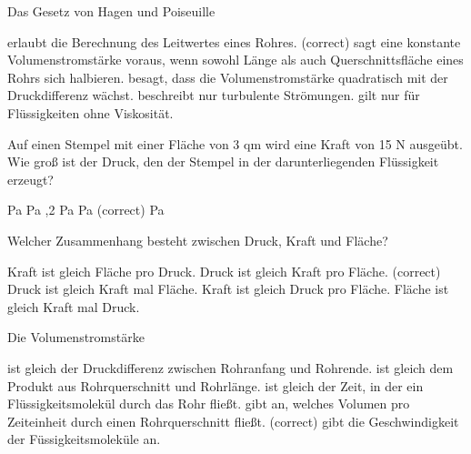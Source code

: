 \documentclass[11pt]{exam}
\begin{document}
\setlength{\voffset}{-0.5in}
\setlength{\headsep}{5pt}

\hspace{2mm}
 \hspace{5mm}
\vspace{4mm}

\begin{questions}

\question Das Gesetz von Hagen und Poiseuille

\begin{choices}
	\choice erlaubt die Berechnung des Leitwertes eines Rohres. (correct)
	\choice sagt eine konstante Volumenstromstärke voraus, wenn sowohl Länge als auch Querschnittsfläche eines Rohrs sich halbieren.
	\choice besagt, dass die Volumenstromstärke quadratisch mit der Druckdifferenz wächst.
	\choice beschreibt nur turbulente Strömungen.
	\choice gilt nur für Flüssigkeiten ohne Viskosität.
\end{choices}

\vspace{3mm}\question Auf einen Stempel mit einer Fläche von 3 qm wird eine Kraft von 15 N ausgeübt. Wie groß ist der Druck, den der Stempel in der darunterliegenden Flüssigkeit erzeugt?

\begin{choices}
	 Pa
	 Pa
	,2 Pa
	 Pa (correct)
	 Pa
\end{choices}

\vspace{3mm}\question Welcher Zusammenhang besteht zwischen Druck, Kraft und Fläche?

\begin{choices}
	\choice Kraft ist gleich Fläche pro Druck.
	\choice Druck ist gleich Kraft pro Fläche. (correct)
	\choice Druck ist gleich Kraft mal Fläche.
	\choice Kraft ist gleich Druck pro Fläche.
	\choice Fläche ist gleich Kraft mal Druck.
\end{choices}

\vspace{3mm}\question Die Volumenstromstärke

\begin{choices}
	\choice ist gleich der Druckdifferenz zwischen Rohranfang und Rohrende.
	\choice ist gleich dem Produkt aus Rohrquerschnitt und Rohrlänge.
	\choice ist gleich der Zeit, in der ein Flüssigkeitsmolekül durch das Rohr fließt.
	\choice gibt an, welches Volumen pro Zeiteinheit durch einen Rohrquerschnitt fließt. (correct)
	\choice gibt die Geschwindigkeit der Füssigkeitsmoleküle an.
\end{choices}


\end{questions}
\end{document}
